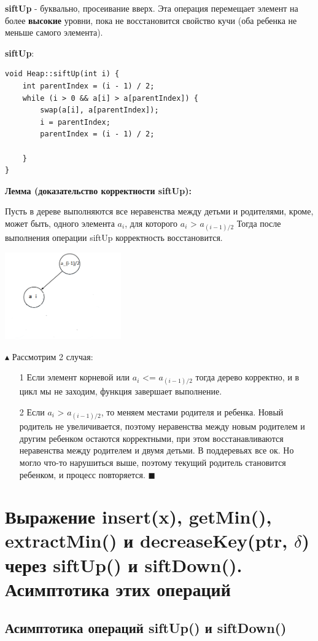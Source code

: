     \textbf{siftUp} - буквально, просеивание вверх. Эта операция перемещает элемент на более \textbf{высокие} уровни, пока не восстановится свойство кучи (оба ребенка не меньше самого элемента). 

\textbf{siftUp}:
\begin{lstlisting}
void Heap::siftUp(int i) {
    int parentIndex = (i - 1) / 2;
    while (i > 0 && a[i] > a[parentIndex]) {
        swap(a[i], a[parentIndex]);
        i = parentIndex;
        parentIndex = (i - 1) / 2;

    }
}
\end{lstlisting}
\textbf{
Лемма (доказательство корректности siftUp):}

Пусть в дереве выполняются все неравенства между детьми и родителями, кроме, может быть, одного элемента $a_{i}$, для которого  $a_{i}$ > $a_{(i-1)/2}$ Тогда после выполнения операции siftUp корректность восстановится.

\includegraphics[width=5cm]{images/23_2}

$\blacktriangle$ Рассмотрим 2 случая:
\begin{itemize}
\item[1] Если элемент корневой или $a_{i}$ <= $a_{(i-1)/2}$ тогда дерево корректно, и в цикл мы не заходим, функция завершает выполнение.
\item[2] Если $a_{i}$ > $a_{(i-1)/2}$, то меняем местами родителя и ребенка. Новый родитель не увеличивается, поэтому неравенства между новым родителем и другим ребенком остаются корректными, при этом восстанавливаются неравенства между родителем и двумя детьми. В поддеревьях все ок. Но могло что-то нарушиться выше, поэтому текущий родитель становится ребенком, и процесс повторяется. $\blacksquare$
\end{itemize} 

\section{Выражение insert(x), getMin(), extractMin() и decreaseKey(ptr, $\delta$) через siftUp() и siftDown(). Асимптотика этих операций}
\subsection*{Асимптотика операций siftUp() и siftDown()}

